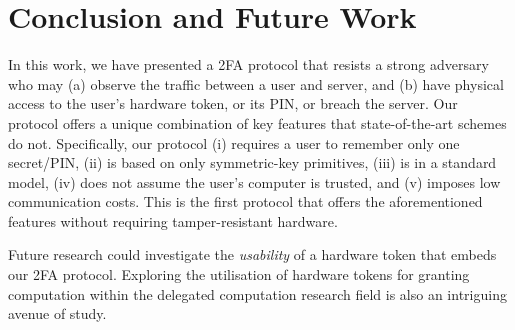 

\section{Conclusion and Future Work}

In this work, we have presented a 2FA protocol that resists a strong adversary who may (a) observe the traffic between a user and server, and (b) have physical access to the user’s hardware token, or its PIN, or breach the server. Our protocol offers a unique combination of key features that state-of-the-art schemes do not. Specifically,  our protocol (i) requires a user to remember only one secret/PIN, (ii) is based on only symmetric-key primitives, (iii) is in a standard model, (iv) does not assume the user's computer is trusted, and (v) imposes low communication costs. 
% 
This is the first protocol that offers the aforementioned features without requiring tamper-resistant hardware. 

Future research could investigate the \emph{usability} of a hardware token that embeds our 2FA protocol. Exploring the utilisation of hardware tokens for granting computation within the delegated computation research field is also an intriguing avenue of study.




